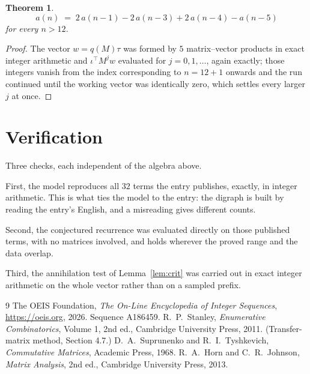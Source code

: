 \documentclass[11pt,a4paper]{article}
\theoremstyle{plain}
\newtheorem{theorem}{Theorem}
\theoremstyle{definition}
\begin{document}
\begin{theorem}
\[
a(n)\;=\;2\,a(n-1) - 2\,a(n-3) + 2\,a(n-4) - a(n-5)
\]
for every $n>12$.
\end{theorem}

\begin{proof}
The vector $w=q(M)\tau$ was formed by $5$ matrix--vector products in exact integer
arithmetic and $\iota^{\!\top}M^{j}w$ evaluated for $j=0,1,\dots$, again exactly; those
integers vanish from the index corresponding to $n=12+1$ onwards and the run continued
until the working vector was identically zero, which settles every larger $j$ at once.
\end{proof}

\section{Verification}

Three checks, each independent of the algebra above.

First, the model reproduces all $32$ terms the entry publishes, exactly, in integer
arithmetic. This is what ties the model to the entry: the digraph is built by reading the
entry's English, and a misreading gives different counts.

Second, the conjectured recurrence was evaluated directly on those published terms, with no
matrices involved, and holds wherever the proved range and the data overlap.

Third, the annihilation test of Lemma~\ref{lem:crit} was carried out in exact integer
arithmetic on the whole vector rather than on a sampled prefix.

\begin{thebibliography}{9}
 The OEIS Foundation, \emph{The On-Line Encyclopedia of Integer
Sequences}, \url{https://oeis.org}, 2026. Sequence A186459.
 R.~P.~Stanley, \emph{Enumerative Combinatorics}, Volume 1, 2nd ed.,
Cambridge University Press, 2011. (Transfer-matrix method, Section 4.7.)
 D.~A.~Suprunenko and R.~I.~Tyshkevich, \emph{Commutative Matrices},
Academic Press, 1968.
 R.~A.~Horn and C.~R.~Johnson, \emph{Matrix Analysis}, 2nd ed., Cambridge
University Press, 2013.
\end{thebibliography}
\end{document}
